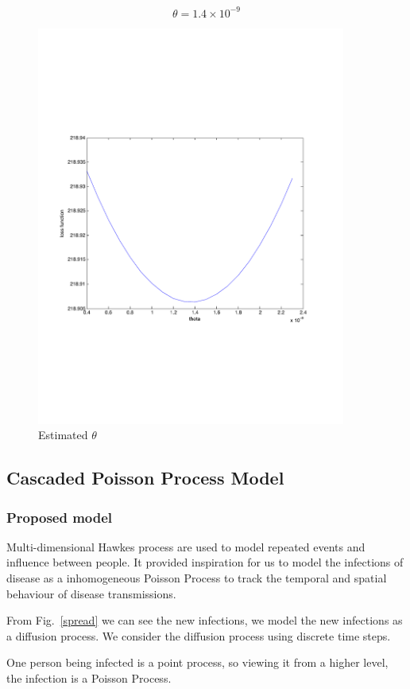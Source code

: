\documentclass[12pt]{article}
\begin{document}
$$\theta = 1.4\times 10^{-9}$$
\begin{figure}[hbt]
\begin{center}
  \includegraphics[width=4in]{graph/est.pdf}
  \caption{Estimated $\theta$}
  \label{est}
\end{center}  
\end{figure}

\subsection{Cascaded Poisson Process Model}
\subsubsection{Proposed model}
Multi-dimensional Hawkes process\cite{zhou2013learning} are used to model repeated events and influence between people. It provided inspiration for us to model the infections of disease as a inhomogeneous Poisson Process to track the temporal and spatial behaviour of disease transmissions.

From Fig.~\ref{spread} we can see the new infections, we model the new infections as a diffusion process. We consider the diffusion process using discrete time steps.

One person being infected is a point process, so viewing it from a higher level, the infection is a Poisson Process.
\end{document}

